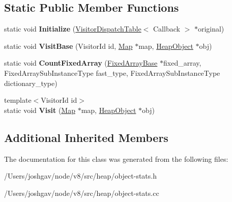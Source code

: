 \subsection*{Static Public Member Functions}
\begin{DoxyCompactItemize}
\item 
static void {\bfseries Initialize} (\hyperlink{classv8_1_1internal_1_1_visitor_dispatch_table}{Visitor\+Dispatch\+Table}$<$ Callback $>$ $\ast$original)\hypertarget{classv8_1_1internal_1_1_object_stats_visitor_a640d52753f618239375d50b74709314d}{}\label{classv8_1_1internal_1_1_object_stats_visitor_a640d52753f618239375d50b74709314d}

\item 
static void {\bfseries Visit\+Base} (Visitor\+Id id, \hyperlink{classv8_1_1internal_1_1_map}{Map} $\ast$map, \hyperlink{classv8_1_1internal_1_1_heap_object}{Heap\+Object} $\ast$obj)\hypertarget{classv8_1_1internal_1_1_object_stats_visitor_a780f37fcd32df38aa95394eb87e93007}{}\label{classv8_1_1internal_1_1_object_stats_visitor_a780f37fcd32df38aa95394eb87e93007}

\item 
static void {\bfseries Count\+Fixed\+Array} (\hyperlink{classv8_1_1internal_1_1_fixed_array_base}{Fixed\+Array\+Base} $\ast$fixed\+\_\+array, Fixed\+Array\+Sub\+Instance\+Type fast\+\_\+type, Fixed\+Array\+Sub\+Instance\+Type dictionary\+\_\+type)\hypertarget{classv8_1_1internal_1_1_object_stats_visitor_af87d35fc41fbeb39257ce8408e47ccfa}{}\label{classv8_1_1internal_1_1_object_stats_visitor_af87d35fc41fbeb39257ce8408e47ccfa}

\item 
{\footnotesize template$<$Visitor\+Id id$>$ }\\static void {\bfseries Visit} (\hyperlink{classv8_1_1internal_1_1_map}{Map} $\ast$map, \hyperlink{classv8_1_1internal_1_1_heap_object}{Heap\+Object} $\ast$obj)\hypertarget{classv8_1_1internal_1_1_object_stats_visitor_a1c395389d6b77fe4518ca2bdedcf8df2}{}\label{classv8_1_1internal_1_1_object_stats_visitor_a1c395389d6b77fe4518ca2bdedcf8df2}

\end{DoxyCompactItemize}
\subsection*{Additional Inherited Members}


The documentation for this class was generated from the following files\+:\begin{DoxyCompactItemize}
\item 
/\+Users/joshgav/node/v8/src/heap/object-\/stats.\+h\item 
/\+Users/joshgav/node/v8/src/heap/object-\/stats.\+cc\end{DoxyCompactItemize}
